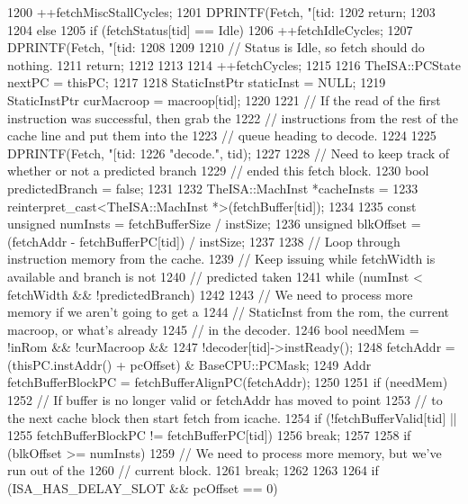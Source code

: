 \begin{DoxyCode}
{{{1200             ++fetchMiscStallCycles;
1201             DPRINTF(Fetch, "[tid:%
1202             return;
1203         }
1204     } else {
1205         if (fetchStatus[tid] == Idle) {
1206             ++fetchIdleCycles;
1207             DPRINTF(Fetch, "[tid:%
1208         }
1209 
1210         // Status is Idle, so fetch should do nothing.
1211         return;
1212     }
1213 
1214     ++fetchCycles;
1215 
1216     TheISA::PCState nextPC = thisPC;
1217 
1218     StaticInstPtr staticInst = NULL;
1219     StaticInstPtr curMacroop = macroop[tid];
1220 
1221     // If the read of the first instruction was successful, then grab the
1222     // instructions from the rest of the cache line and put them into the
1223     // queue heading to decode.
1224 
1225     DPRINTF(Fetch, "[tid:%
1226             "decode.\n", tid);
1227 
1228     // Need to keep track of whether or not a predicted branch
1229     // ended this fetch block.
1230     bool predictedBranch = false;
1231 
1232     TheISA::MachInst *cacheInsts =
1233         reinterpret_cast<TheISA::MachInst *>(fetchBuffer[tid]);
1234 
1235     const unsigned numInsts = fetchBufferSize / instSize;
1236     unsigned blkOffset = (fetchAddr - fetchBufferPC[tid]) / instSize;
1237 
1238     // Loop through instruction memory from the cache.
1239     // Keep issuing while fetchWidth is available and branch is not
1240     // predicted taken
1241     while (numInst < fetchWidth && !predictedBranch) {
1242 
1243         // We need to process more memory if we aren't going to get a
1244         // StaticInst from the rom, the current macroop, or what's already
1245         // in the decoder.
1246         bool needMem = !inRom && !curMacroop &&
1247             !decoder[tid]->instReady();
1248         fetchAddr = (thisPC.instAddr() + pcOffset) & BaseCPU::PCMask;
1249         Addr fetchBufferBlockPC = fetchBufferAlignPC(fetchAddr);
1250 
1251         if (needMem) {
1252             // If buffer is no longer valid or fetchAddr has moved to point
1253             // to the next cache block then start fetch from icache.
1254             if (!fetchBufferValid[tid] ||
1255                 fetchBufferBlockPC != fetchBufferPC[tid])
1256                 break;
1257 
1258             if (blkOffset >= numInsts) {
1259                 // We need to process more memory, but we've run out of the
1260                 // current block.
1261                 break;
1262             }
1263 
1264             if (ISA_HAS_DELAY_SLOT && pcOffset == 0) {
}}}}
\end{DoxyCode}
